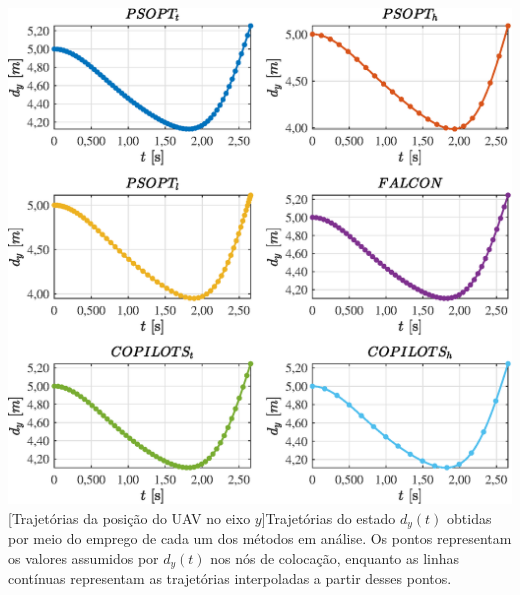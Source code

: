 \noindent
\begin{minipage}{\textwidth}
	\vspace{\onelineskip}
	\centering
	\includegraphics[scale=0.7]{fig/resultados/uav/traj/x/d_y}
	[Trajetórias da posição do UAV no eixo $y$]{Trajetórias do estado $ d_y(t) $ obtidas por meio do emprego de cada um dos métodos em análise. Os pontos representam os valores assumidos por $ d_y(t) $ nos nós de colocação, enquanto as linhas contínuas representam as trajetórias interpoladas a partir desses pontos.}
	\label{fig:uav:x:d_y}
	\vspace{\onelineskip}
\end{minipage}


